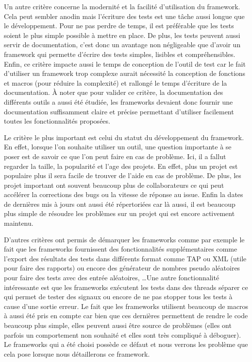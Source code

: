 \documentclass[a4paper]{article}
\begin{document}
Un autre critère concerne la modernité et la facilité d'utilisation du
framework. Cela peut sembler anodin mais l'écriture des tests est une tâche
aussi longue que le développement. Pour ne pas perdre de temps, il est
préférable que les tests soient le plus simple possible à mettre en place. De
plus, les tests peuvent aussi servir de documentation, c'est donc un avantage
non négligeable que d'avoir un framework qui permette d'écrire des tests
simples, lisibles et compréhensibles. Enfin, ce critère impacte aussi le temps
de conception de l'outil de test car le fait d'utiliser un framework trop
complexe aurait nécessité la conception de fonctions et macros (pour réduire la
complexité) et rallongé le temps d'écriture de la documentation. À noter que
pour valider ce critère, la documentation des différents outils a aussi été
étudiée, les frameworks devaient donc fournir une documentation suffisamment
claire et précise permettant d'utiliser facilement toutes les fonctionnalités
proposées.

Le critère le plus important est celui du statut du développement du framework.
En effet, lorsque l'on souhaite utiliser un outil, une question importante à se
poser est de savoir ce que l'on peut faire en cas de problème. Ici, il a fallut
regarder la taille, la popularité et l'age des projets. En effet, plus un projet
est populaire plus il sera facile de trouver de l'aide en cas de problème. De
plus, les projet important ont souvent beaucoup plus de collaborateurs ce qui
peut accélérer la corrections des bugs ou la vitesse de réponse au issue. Enfin
la dates de dernières mis à jours ont aussi été répertoriées car là aussi, il
est beaucoup plus simple de résoudre les problèmes sur un projet qui est encore
activement maintenu.

D'autres critères ont permis de démarquer les frameworks comme par exemple le
fait que les frameworks fournissent des fonctionnalités supplémentaires comme
l'export des résultats des tests dans différents format comme TAP ou XML (utile
pour faire des rapports) ou encore des générateur de nombres pseudo aléatoires
pour faire des tests avec des entrée aléatoires, \dots Une autre fonctionnalité
intéressante est que les frameworks exécutent les tests dans des threads séparer
ce qui permet de tester des signaux ou encore de ne pas stopper tous les tests à
cause d'une sortie erreur. Le fait que les frameworks utilisent beaucoup de
macros à aussi été pris en compte car bien que ces dernières permettent de
rendre le code beaucoup plus simple, elles peuvent aussi être source de
problèmes (elles ont parfois un comportement non souhaité et elles sont très
compliqué à déboguer). Le frameworks qui a été choisi possède ce défaut et nous
verrons les problème que cela pose lorsque nous détaillerons ce framework.
\end{document}
